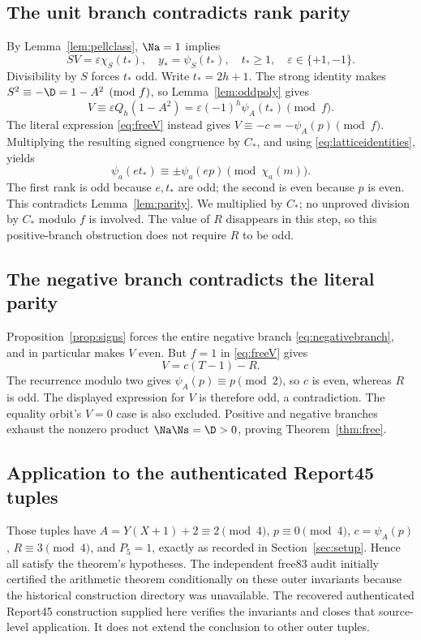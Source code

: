 \subsection{The unit branch contradicts rank parity}
By Lemma~\ref{lem:pellclass}, $\Na=1$ implies
\[
 SV=\varepsilon\chi_S(t_*),\quad y_*=\psi_S(t_*),\quad
 t_*\ge1,\quad \varepsilon\in\{+1,-1\}.
\]
Divisibility by $S$ forces $t_*$ odd. Write $t_*=2h+1$.
The strong identity makes $S^2\equiv-\D=1-A^2\pmod f$,
so Lemma~\ref{lem:oddpoly} gives
\[
 V\equiv\varepsilon Q_h(1-A^2)
 =\varepsilon(-1)^h\psi_A(t_*)\pmod f.
\]
The literal expression \eqref{eq:freeV} instead gives
$V\equiv-c=-\psi_A(p)\pmod f$. Multiplying the resulting signed
congruence by $C_*$, and using \eqref{eq:latticeidentities}, yields
\[
 \psi_a(et_*)\equiv\pm\psi_a(ep)\pmod{\chi_a(m)}.
\]
The first rank is odd because $e,t_*$ are odd; the second is even
because $p$ is even. This contradicts Lemma~\ref{lem:parity}.
We multiplied by $C_*$; no unproved division by $C_*$ modulo $f$
is involved. The value of $R$ disappears in this step, so this
positive-branch obstruction does not require $R$ to be odd.

\subsection{The negative branch contradicts the literal parity}
Proposition~\ref{prop:signs} forces the entire negative branch
\eqref{eq:negativebranch}, and in particular makes $V$ even.
But $f=1$ in \eqref{eq:freeV} gives
\[
 V=c(T-1)-R.
\]
The recurrence modulo two gives $\psi_A(p)\equiv p\pmod2$,
so $c$ is even, whereas $R$ is odd. The displayed expression for
$V$ is therefore odd, a contradiction. The equality orbit's
$V=0$ case is also excluded. Positive and negative branches exhaust
the nonzero product $\Na\Ns=\D>0$, proving
Theorem~\ref{thm:free}.

\subsection{Application to the authenticated Report45 tuples}
Those tuples have $A=Y(X+1)+2\equiv2\pmod4$,
$p\equiv0\pmod4$, $c=\psi_A(p)$, $R\equiv3\pmod4$, and
$P_5=1$, exactly as recorded in Section~\ref{sec:setup}.
Hence all satisfy the theorem's hypotheses. The independent free83
audit initially certified the arithmetic theorem conditionally on these
outer invariants because the historical construction directory was
unavailable. The recovered authenticated Report45 construction supplied
here verifies the invariants and closes that source-level application.
It does not extend the conclusion to other outer tuples.

